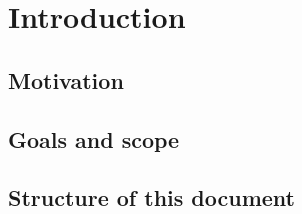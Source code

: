 \chapter{Introduction}
\label{ch:introduction}

\section{Motivation}

\section{Goals and scope}

\section{Structure of this document}
